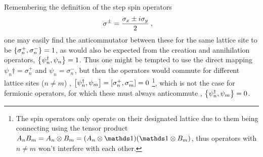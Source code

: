 \documentclass[../main.tex]{subfiles} %
\begin{document}
Remembering the definition of the step spin operators \cite{sakurai_modernQM_2017}
\begin{align} \index{sigmaplus@$\sigma^+$}\index{sigmaminus@$\sigma^-$}
    \sigma^\pm &= \frac{\sigma_x \pm i \sigma_y}{2} \: ,
\end{align}
one may easily find the anticommutator between these for the same lattice site to be $\anticommutator{\sigma_n^+}{\sigma_n^-} = 1$, as would also be expected from the creation and annihilation operators, $\anticommutator{\psi_n\dagger}{\psi_n} = 1$. Thus one might be tempted to use the direct mapping $\psi_n\dagger = \sigma_n^+$ and $\psi_n = \sigma_n^-$, but then the operators would commute for different lattice sites ($n \ne m$) \cite{susskind_latticeFermions_1977}, $\commutator{\psi_n\dagger}{\psi_m} = \commutator{\sigma_n^+}{\sigma_m^-} = 0$ \footnote{The spin operators only operate on their designated lattice due to them being connecting using the tensor product $A_n B_m = A_n \otimes B_m = (A_n \otimes \id)(\id \otimes B_m)$, thus operators with $n \ne m$ won't interfere with each other.}, which is not the case for fermionic operators, for which these must always anticommute \cite{sakurai_modernQM_2017}, $\anticommutator{\psi_n\dagger}{\psi_m} = 0$.
\end{document}
